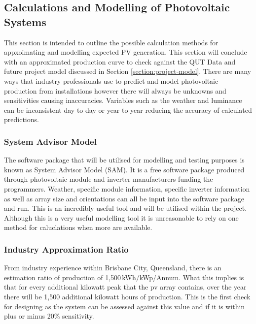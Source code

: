 
\subsection{Calculations and Modelling of Photovoltaic Systems} \label{section:PV-Calculations}

This section is intended to outline the possible calculation methods for appxoimating and modelling expected PV generation. This section will conclude with an approximated production curve to check against the QUT Data and future project model discussed in Section \ref{section:project-model}. There are many ways that industry professionals use to predict and model photovoltaic production from installations however there will always be unknowns and sensitivities causing inaccuracies. Variables such as the weather and luminance can be inconsistent day to day or year to year reducing the accuracy of calculated predictions.

\subsubsection{System Advisor Model}

The software package that will be utilised for modelling and testing purposes is known as System Advisor Model (SAM). It is a free software package produced through photovoltaic module and inverter manufacturers funding the programmers. Weather, specific module information, specific inverter information as well as array size and orientations can all be input into the software package and run. This is an incredibly useful tool and will be utilised within the project. Although this is a very useful modelling tool it is unreasonable to rely on one method for caluclations when more are available. 

\subsubsection{Industry Approximation Ratio}

From industry experience within Brisbane City, Queensland, there is an estimation ratio of production of 1,500\,kWh/kWp/Annum. What this implies is that for every additional kilowatt peak that the pv array contains, over the year there will be 1,500 additional kilowatt hours of production. This is the first check for designing as the system can be assessed against this value and if it is within plus or minus 20\% sensitivity.  

